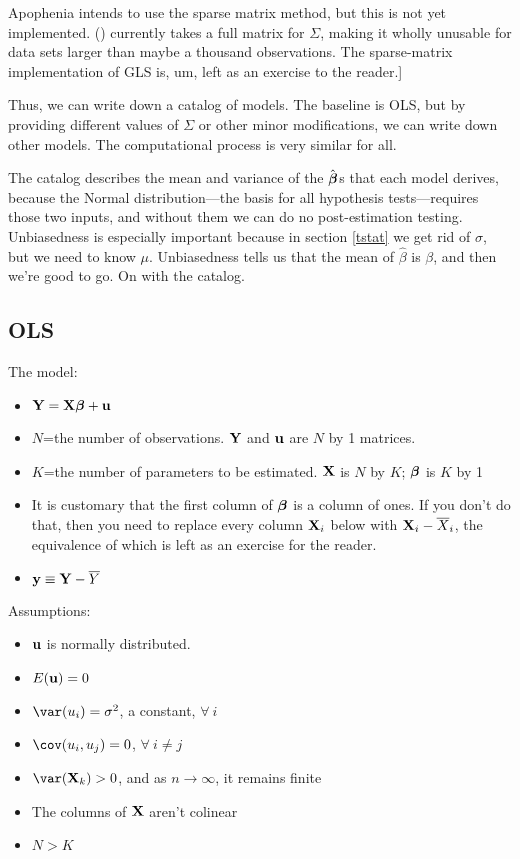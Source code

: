 Apophenia intends to use the sparse matrix method, but this is not yet
implemented. () currently takes a full matrix
for $\Sigma$, making it wholly unusable for data sets larger than maybe a
thousand observations. The sparse-matrix implementation of GLS is, um,
left as an exercise to the reader.]

Thus, we can write down a catalog of models. The baseline is OLS, but by
providing different values of $\Sigma$ or other minor modifications, we
can write down other models. The computational process is very similar
for all.

The catalog describes the mean and variance of the $\hat{{\mbox{\boldmath$\beta$}}}$s that
each model derives, because the Normal distribution---the basis for all
hypothesis tests---requires those two inputs,
and without them we can do no post-estimation testing. Unbiasedness is especially
important because in section \ref{tstat} we get rid of $\sigma$, but we
need to know $\mu$. Unbiasedness tells us that the mean of $\hat\beta$
is $\beta$, and then we're good to go. On with the catalog.

\subsection{OLS}
The model: 
\begin{itemize}
\item ${\bf Y}={\bf X}{\mbox{\boldmath$\beta$}} + {\bf u}$
\item $N$=the number of observations. ${\bf Y}$ and ${\bf u}$ are $N$ by 1
matrices.
\item $K$=the number of parameters to be estimated. ${\bf X}$ is $N$ by $K$;
${\mbox{\boldmath$\beta$}}$ is $K$ by 1
\item It is customary that the first column of ${\mbox{\boldmath$\beta$}}$ is a column of
ones. If you don't do that, then you need to replace every column ${\bf X}_i$ below
with ${\bf X}_i-\overline X_i$, the equivalence of which is left as an exercise
for the reader.
\item ${\bf y}\equiv {\bf Y} - \overline Y$
\end{itemize}

Assumptions:

\begin{itemize}
\item ${\bf u}$ is normally distributed.
\item $E({\bf u}) = 0$
\item $\var(u_i) = \sigma^2$, a constant, $\forall\ i$
\item $\cov(u_i, u_j) = 0$, $\forall\ i\neq j$
\item $\var(\Xv_k)>0$, and as $n\to\infty$, it remains finite
\item The columns of ${\bf X}$ aren't colinear
\item $N>K$
\end{itemize}

